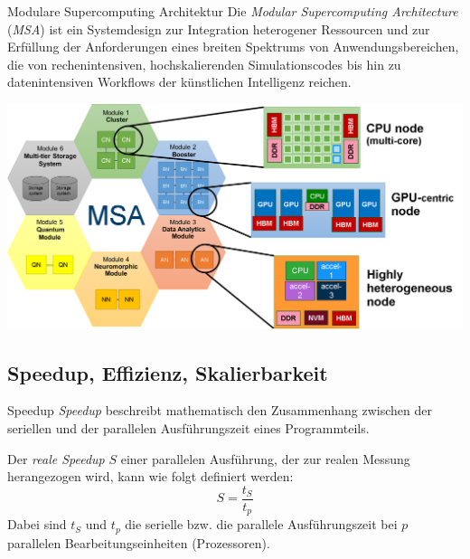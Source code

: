 \begin{jsc}{Modulare Supercomputing Architektur}
    Die \emph{Modular Supercomputing Architecture} (\emph{MSA}) ist ein Systemdesign zur Integration heterogener Ressourcen und zur Erfüllung der Anforderungen eines breiten Spektrums von Anwendungsbereichen, die von rechenintensiven, hochskalierenden Simulationscodes bis hin zu datenintensiven Workflows der künstlichen Intelligenz reichen.
    
    \vspace{1em}
    
    \centering
    \includegraphics[width=0.9\linewidth]{images/modular_supercomputing_architecture.png}
\end{jsc}

\subsection{Speedup, Effizienz, Skalierbarkeit}

\begin{defi}{Speedup}
    \emph{Speedup} beschreibt mathematisch den Zusammenhang zwischen der seriellen und der parallelen Ausführungszeit eines Programmteils.
    
    Der \emph{reale Speedup} $S$ einer parallelen Ausführung, der zur realen Messung herangezogen wird, kann wie folgt definiert werden:
    \[
        S = \frac{t_S}{t_p}
    \]
    Dabei sind $t_S$ und $t_p$ die serielle bzw. die parallele Ausführungszeit bei $p$ parallelen Bearbeitungseinheiten (Prozessoren).
\end{defi}

